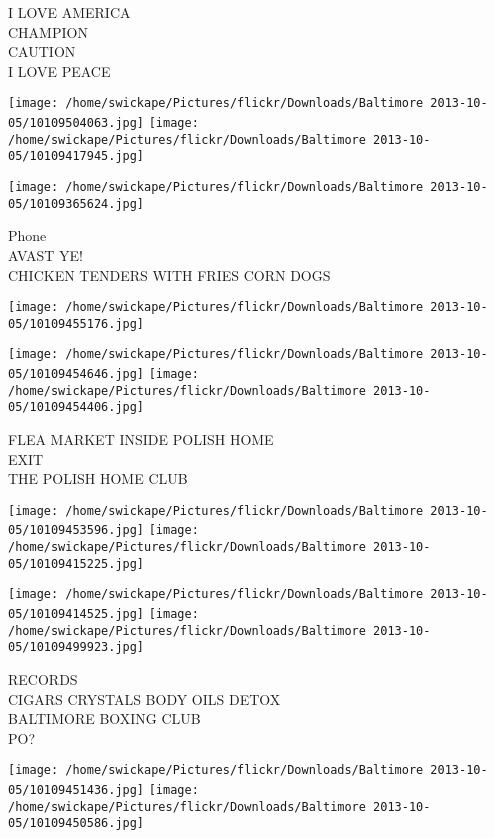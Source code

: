 \documentclass[10pt,letterpaper]{article}
\begin{document}
I LOVE AMERICA\\
CHAMPION\\
CAUTION\\
I LOVE PEACE\\
\pagebreak

\texttt{[image: /home/swickape/Pictures/flickr/Downloads/Baltimore 2013-10-05/10109504063.jpg]}
\texttt{[image: /home/swickape/Pictures/flickr/Downloads/Baltimore 2013-10-05/10109417945.jpg]}

\vspace{0.25in}
\texttt{[image: /home/swickape/Pictures/flickr/Downloads/Baltimore 2013-10-05/10109365624.jpg]}

Phone\\
AVAST YE!\\
CHICKEN TENDERS WITH FRIES CORN DOGS\\
\pagebreak

\texttt{[image: /home/swickape/Pictures/flickr/Downloads/Baltimore 2013-10-05/10109455176.jpg]}

\vspace{0.25in}
\texttt{[image: /home/swickape/Pictures/flickr/Downloads/Baltimore 2013-10-05/10109454646.jpg]}
\texttt{[image: /home/swickape/Pictures/flickr/Downloads/Baltimore 2013-10-05/10109454406.jpg]}

FLEA MARKET INSIDE POLISH HOME\\
EXIT\\
THE POLISH HOME CLUB\\
\pagebreak

\texttt{[image: /home/swickape/Pictures/flickr/Downloads/Baltimore 2013-10-05/10109453596.jpg]}
\texttt{[image: /home/swickape/Pictures/flickr/Downloads/Baltimore 2013-10-05/10109415225.jpg]}

\texttt{[image: /home/swickape/Pictures/flickr/Downloads/Baltimore 2013-10-05/10109414525.jpg]}
\texttt{[image: /home/swickape/Pictures/flickr/Downloads/Baltimore 2013-10-05/10109499923.jpg]}

RECORDS\\
CIGARS CRYSTALS BODY OILS DETOX\\
BALTIMORE BOXING CLUB\\
PO?\\
\pagebreak

\texttt{[image: /home/swickape/Pictures/flickr/Downloads/Baltimore 2013-10-05/10109451436.jpg]}
\texttt{[image: /home/swickape/Pictures/flickr/Downloads/Baltimore 2013-10-05/10109450586.jpg]}
\end{document}
